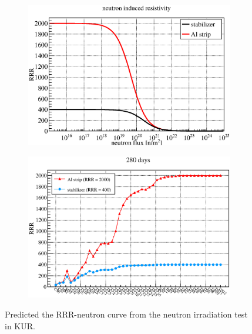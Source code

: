  \begin{figure}[H]
   \begin{subfigure}{0.3\textwidth}
    \centering
	\includegraphics[scale=0.43]{chapter5/fig/degradation.eps}
   \end{subfigure}
   \hspace{0.2\textwidth}
   \begin{subfigure}{0.3\textwidth}
    \centering
	\includegraphics[scale=0.43]{chapter5/fig/rrrmagnets.eps}
   \end{subfigure}
   \caption{ Predicted the RRR-neutron curve from the neutron irradiation test in KUR.}
   \label{4rrr}
  \end{figure}

